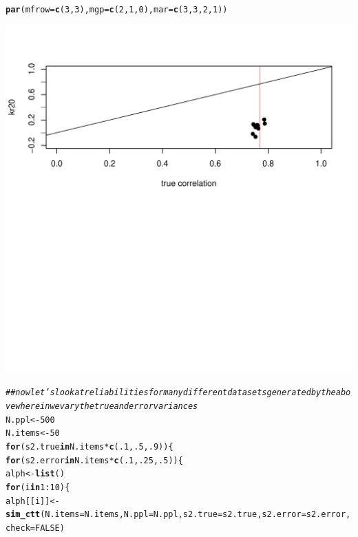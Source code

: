 \documentclass{article}\usepackage[]{graphicx}\usepackage[]{color}
\makeatletter
\def\maxwidth{ %
  \ifdim\Gin@nat@width>\linewidth
    \linewidth
  \else
    \Gin@nat@width
  \fi
}
\newcommand{\hlnum}[1]{\textcolor[rgb]{0.686,0.059,0.569}{#1}}%
\newcommand{\hlcom}[1]{\textcolor[rgb]{0.678,0.584,0.686}{\textit{#1}}}%
\newcommand{\hlopt}[1]{\textcolor[rgb]{0,0,0}{#1}}%
\newcommand{\hlstd}[1]{\textcolor[rgb]{0.345,0.345,0.345}{#1}}%
\newcommand{\hlkwa}[1]{\textcolor[rgb]{0.161,0.373,0.58}{\textbf{#1}}}%
\newcommand{\hlkwb}[1]{\textcolor[rgb]{0.69,0.353,0.396}{#1}}%
\newcommand{\hlkwc}[1]{\textcolor[rgb]{0.333,0.667,0.333}{#1}}%
\newcommand{\hlkwd}[1]{\textcolor[rgb]{0.737,0.353,0.396}{\textbf{#1}}}%
\newenvironment{kframe}{%
 \def\at@end@of@kframe{}%
 \ifinner\ifhmode%
  \def\at@end@of@kframe{\end{minipage}}%
  \begin{minipage}{\columnwidth}%
 \fi\fi%
 \def\FrameCommand##1{\hskip\@totalleftmargin \hskip-\fboxsep
 \colorbox{shadecolor}{##1}\hskip-\fboxsep
     \hskip-\linewidth \hskip-\@totalleftmargin \hskip\columnwidth}%
 \MakeFramed {\advance\hsize-\width
   \@totalleftmargin\z@ \linewidth\hsize
   \@setminipage}}%
 {\par\unskip\endMakeFramed%
 \at@end@of@kframe}
\newenvironment{knitrout}{}{} %
\makeatother
\begin{document}
\begin{knitrout}
\begin{kframe}
\begin{alltt}
\hlkwd{par}\hlstd{(}\hlkwc{mfrow}\hlstd{=}\hlkwd{c}\hlstd{(}\hlnum{3}\hlstd{,}\hlnum{3}\hlstd{),}\hlkwc{mgp}\hlstd{=}\hlkwd{c}\hlstd{(}\hlnum{2}\hlstd{,}\hlnum{1}\hlstd{,}\hlnum{0}\hlstd{),}\hlkwc{mar}\hlstd{=}\hlkwd{c}\hlstd{(}\hlnum{3}\hlstd{,}\hlnum{3}\hlstd{,}\hlnum{2}\hlstd{,}\hlnum{1}\hlstd{))}
\end{alltt}
\end{kframe}
\includegraphics[width=\maxwidth]{figure/unnamed-chunk-2-11} 
\begin{kframe}\begin{alltt}
\hlcom{##now let's look at reliabilities for many different datasets generated by the above wherein we vary the true and error variances}
\hlstd{N.ppl}\hlkwb{<-}\hlnum{500}
\hlstd{N.items}\hlkwb{<-}\hlnum{50}
\hlkwa{for} \hlstd{(s2.true} \hlkwa{in} \hlstd{N.items}\hlopt{*}\hlkwd{c}\hlstd{(}\hlnum{.1}\hlstd{,}\hlnum{.5}\hlstd{,}\hlnum{.9}\hlstd{)) \{}
    \hlkwa{for} \hlstd{(s2.error} \hlkwa{in} \hlstd{N.items}\hlopt{*}\hlkwd{c}\hlstd{(}\hlnum{.1}\hlstd{,}\hlnum{.25}\hlstd{,}\hlnum{.5}\hlstd{)) \{}
        \hlstd{alph}\hlkwb{<-}\hlkwd{list}\hlstd{()}
        \hlkwa{for} \hlstd{(i} \hlkwa{in} \hlnum{1}\hlopt{:}\hlnum{10}\hlstd{) \{}
            \hlstd{alph[[i]]}\hlkwb{<-}\hlkwd{sim_ctt}\hlstd{(}\hlkwc{N.items}\hlstd{=N.items,}\hlkwc{N.ppl}\hlstd{=N.ppl,}\hlkwc{s2.true}\hlstd{=s2.true,}\hlkwc{s2.error}\hlstd{=s2.error,}\hlkwc{check}\hlstd{=}\hlnum{FALSE}\hlstd{)}

\end{alltt}
\end{kframe}
\end{knitrout}
\end{document}
